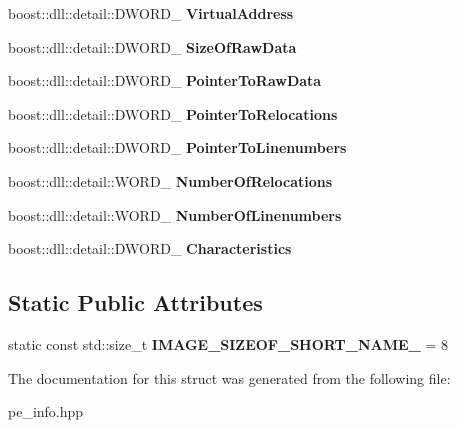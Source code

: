 \begin{DoxyCompactItemize}
\begin{tabbing}
\end{tabbing}\item 
\mbox{\label{a01600_a35eccaade9e46aa496b3dac07499fe39}} 
boost\+::dll\+::detail\+::\+D\+W\+O\+R\+D\+\_\+ {\bfseries Virtual\+Address}
\item 
\mbox{\label{a01600_afa69e63f2937f44f97ac23666be9d41e}} 
boost\+::dll\+::detail\+::\+D\+W\+O\+R\+D\+\_\+ {\bfseries Size\+Of\+Raw\+Data}
\item 
\mbox{\label{a01600_ac6df0a4de0101e07e9a7acda52a37e79}} 
boost\+::dll\+::detail\+::\+D\+W\+O\+R\+D\+\_\+ {\bfseries Pointer\+To\+Raw\+Data}
\item 
\mbox{\label{a01600_abd4b898e8d8100a7b9136deaa0a707ed}} 
boost\+::dll\+::detail\+::\+D\+W\+O\+R\+D\+\_\+ {\bfseries Pointer\+To\+Relocations}
\item 
\mbox{\label{a01600_ae07e5d087d87b2c974c2240e588969c9}} 
boost\+::dll\+::detail\+::\+D\+W\+O\+R\+D\+\_\+ {\bfseries Pointer\+To\+Linenumbers}
\item 
\mbox{\label{a01600_a4ec45186d4ed93d26d49a2be0e91e486}} 
boost\+::dll\+::detail\+::\+W\+O\+R\+D\+\_\+ {\bfseries Number\+Of\+Relocations}
\item 
\mbox{\label{a01600_a1de6e8291c2d0c56d23121a6c7aaaaa3}} 
boost\+::dll\+::detail\+::\+W\+O\+R\+D\+\_\+ {\bfseries Number\+Of\+Linenumbers}
\item 
\mbox{\label{a01600_ac240795840b159ec9fe624eae3969314}} 
boost\+::dll\+::detail\+::\+D\+W\+O\+R\+D\+\_\+ {\bfseries Characteristics}
\end{DoxyCompactItemize}
\subsection*{Static Public Attributes}
\begin{DoxyCompactItemize}
\item 
\mbox{\label{a01600_ac5eb10907f703acc027687205c5a975f}} 
static const std\+::size\+\_\+t {\bfseries I\+M\+A\+G\+E\+\_\+\+S\+I\+Z\+E\+O\+F\+\_\+\+S\+H\+O\+R\+T\+\_\+\+N\+A\+M\+E\+\_\+} = 8
\end{DoxyCompactItemize}


The documentation for this struct was generated from the following file\+:\begin{DoxyCompactItemize}
\item 
pe\+\_\+info.\+hpp\end{DoxyCompactItemize}
